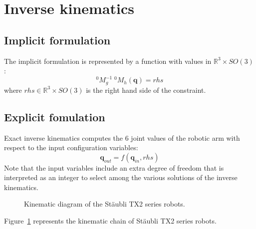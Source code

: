 \documentclass{article}
\newcommand\conf{\mathbf{q}}
\newcommand\reals{\mathbb{R}}
\begin{document}
\section{Inverse kinematics}

\subsection{Implicit formulation}

The implicit formulation is represented by a function with values in $\reals^3\times SO(3)$:
\begin{equation}\label{eq:implicit-formulation}
^0M_g^{-1}\;^0M_h(\conf) = rhs
\end{equation}
where $rhs\in\reals^3\times SO(3)$ is the right hand side of the constraint.

\subsection{Explicit fomulation}

Exact inverse kinematics computes the 6 joint values of the robotic arm with
respect to the input configuration variables:
\begin{equation}\label{eq:inverse-kinematics}
  \conf_{out} = f(\conf_{in}, rhs)
\end{equation}
Note that the input variables include an extra degree of freedom that is interpreted as an integer to select among the various solutions of the inverse kinematics.

\begin{figure}[h]
  \center
  \graphicspath{{./figures/}}
  
  \caption{Kinematic diagram of the Stäubli TX2 series robots.}
  \label{fig:staubli-tx2}
\end{figure}
Figure~\ref{fig:staubli-tx2} represents the kinematic chain of Stäubli TX2 series robots.
\end{document}
